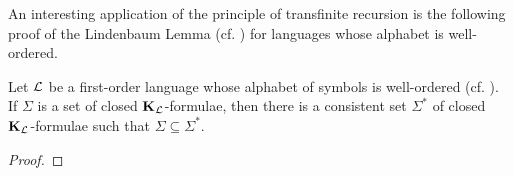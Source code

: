An interesting application of the principle of transfinite recursion is the following proof of the Lindenbaum Lemma (cf. ) for languages whose alphabet is well-ordered.

\begin{boxcorollary}
    Let $\mathcal{L}$ be a first-order language whose alphabet of symbols is well-ordered (cf. \sorry). If $\Sigma$ is a set of closed $\mathbf{K}_{\mathcal{L}}$-formulae, then there is a consistent set $\Sigma^*$ of closed $\mathbf{K}_{\mathcal{L}}$-formulae such that $\Sigma \subseteq \Sigma^*$.
\end{boxcorollary}
\begin{proof}
    \sorry
\end{proof}

